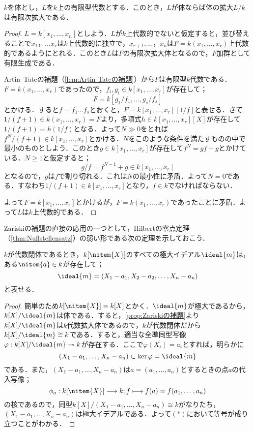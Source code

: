\begin{prop}[Zariskiの補題]\label{prop:Zariskiの補題}
	$k$を体とし，$L$を$k$上の有限型代数とする．このとき，$L$が体ならば体の拡大$L/k$は有限次拡大である．
\end{prop}

\begin{proof}
	$L=k[x_1,\dots,x_n]$としよう．$L$が$k$上代数的でないと仮定すると，並び替えることで$x_1，\dots x_r$は$k$上代数的に独立で，$x_{r+1},\dots，x_n$は$F=k(x_1,\dots,x_r)$上代数的であるようにとれる．このとき$L$は$F$の有限次拡大体となるので，$F$加群として有限生成である．
	
	Artin--Tateの補題（\ref{lem:Artin-Tateの補題}）から$F$は有限型$k$代数である．$F=k(x_1,\dots,x_r)$であったので，$f_i,g_i\in k[x_1,\dots,x_r]$が存在して；
	\[F=k[g_1/f_1,\dots,g_s/f_s]\]
	とかける．すると$f=f_1\dots f_s$とおくと，$F=k[x_1,\dots,x_r][1/f]$と表せる．さて$1/(f+1)\in k(x_1,\dots,x_r)=F$より，多項式$h\in k[x_1,\dots,x_r][X]$が存在して$1/(f+1)=h(1/f)$となる．よって$N\gg0$をとれば$f^N/(f+1)\in k[x_1,\dots,x_r]$とかける．$N$をこのような条件を満たすものの中で最小のものとしよう．このとき$g\in k[x_1,\dots,x_r]$が存在して$f^N=gf+g$とかけている．$N\geq1$と仮定すると；
	\[g/f=f^{N-1}+g\in k[x_1,\dots,x_r]\]
	となるので，$g$は$f$で割り切れる．これは$N$の最小性に矛盾．よって$N=0$である．すなわち$1/(f+1)\in k[x_1,\dots,x_r]$となり，$f\in k$でなければならない．
	
	よって$F=k[x_1,\dots,x_r]$とかけるが，$F=k(x_1,\dots,x_r)$であったことに矛盾．よって$L$は$k$上代数的である．
\end{proof}

Zariskiの補題の直接の応用の一つとして，Hilbertの零点定理（\ref{thm:Nullstellensatz}）の弱い形である次の定理を示しておこう．

\begin{thm}\label{thm:week nullstellensatz}
	$k$が代数閉体であるとき，$k[\nitem{X}]$のすべての極大イデアル$\ideal{m}$は，ある$\nitem{a}\in k$が存在して；
	\[\ideal{m}=(X_1-a_1,X_2-a_2,\dots,X_n-a_n)\]
	と表せる．
\end{thm}
\begin{proof}
	簡単のため$k[\nitem{X}]=k[X]$とかく．$\ideal{m}$が極大であるから，$k[X]/\ideal{m}$は体である．すると，\ref{prop:Zariskiの補題}より$k[X]/\ideal{m}$は$k$代数拡大体であるので，$k$が代数閉体だから$k[X]/\ideal{m}\cong k$である．すると，適当な全準同型写像$\varphi:k[X]/\ideal{m}\twoheadrightarrow k$が存在する．ここで$\varphi(X_i)=a_i$とすれば，明らかに\displaystar
	\[(X_1-a_1,\dots,X_n-a_n)\subset\ker\varphi=\ideal{m}\]
	である．また，$(X_1-a_1,\dots,X_n-a_n)$は$a=(a_1,\dots,a_n)$とするときの点$a$の代入写像；
	\[\phi_a:k[\nitem{X}]\longrightarrow k;f\longmapsto f(a)=f(a_1,\dots,a_n)\]
	の核であるので，同型$k[X]/(X_1-a_1,\dots,X_n-a_n)\cong k$がなりたち，$(X_1-a_1,\dots,X_n-a_n)$は極大イデアルである．よって$(\ast)$において等号が成り立つことがわかる．
\end{proof}
